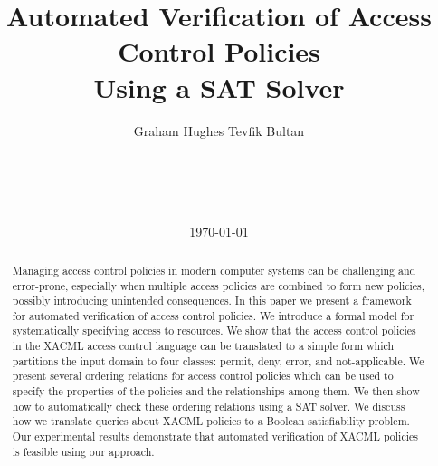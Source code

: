 \documentclass{acm_proc_article-sp}
\begin{document}
\title{Automated Verification of Access Control Policies \\
Using a SAT Solver}
\author{
\alignauthor Graham Hughes \quad Tevfik Bultan \\
       \\
       \\
       \\
       \\
}
\date\today
\maketitle

\begin{abstract}
  Managing access control policies in modern computer systems can be
  challenging and error-prone, especially when multiple access
  policies are combined to form new policies, possibly introducing
  unintended consequences.  In this paper we present a framework for
  automated verification of access control policies.  We introduce a
  formal model for systematically specifying access to resources.  We
  show that the access control policies in the XACML access control
  language can be translated to a simple form which partitions the
  input domain to four classes: permit, deny, error, and
  not-applicable.  We present several ordering relations for access
  control policies which can be used to specify the properties of the
  policies and the relationships among them.  We then show how to
  automatically check these ordering relations using a SAT solver.  We
  discuss how we translate queries about XACML policies to a Boolean
  satisfiability problem.  Our experimental results demonstrate that
  automated verification of XACML policies is feasible using our
  approach.
\end{abstract}












\end{document}
